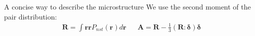 \documentclass{sintefbeamer}
\begin{document}
\begin{frame}
  {A concise way to describe the microstructure}
\footnotesize
  We use the second moment of the pair distribution: 
  \begin{align*}
    \textbf{R} = \int \textbf{rr} P_{nst}(\textbf{r}) d\textbf{r}
    &&
    \textbf{A} = 
    \textbf{R} - \frac{1}{3}(\textbf{R}: \bm\delta) \bm\delta
  \end{align*}

    


\end{frame}
\end{document}
